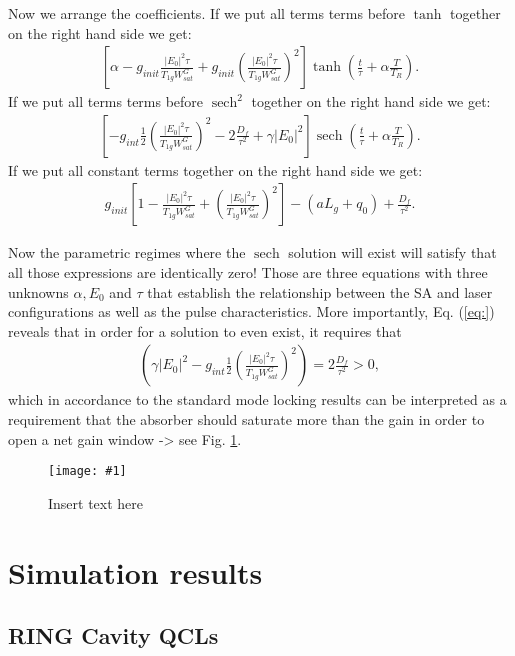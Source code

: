 \documentclass[preprint,secnumarabic,amssymb, nobibnotes, aip, prd]{revtex4-1}
\DeclareMathOperator{\sech}{sech}
\newcommand{\includegraphicsM}[1]{\texttt{[image: \#1]}}
\begin{document}
Now we arrange the coefficients. If we put all terms terms before $\tanh $ together on the right hand side we get:
\begin{align}
\label{eq:coefs1}
\left[\alpha -g_{init}\frac{|E_0|^2\tau}{T_{1g}W_{sat}^G} +g_{init}\left(\frac{|E_0|^2\tau}{T_{1g}W_{sat}^G}\right)^2 \right]\tanh(\frac{t}{\tau}+\alpha \frac{T}{T_R}).
\end{align}
If we put all terms terms before $\sech^2 $ together on the right hand side we get:
\begin{align}
\label{eq:coefs2}
\left[ -g_{int}\frac{1}{2}\left(\frac{|E_0|^2\tau}{T_{1g}W_{sat}^G}\right)^2 - 2\frac{D_f}{\tau^2} +\gamma|E_0|^2\right]\sech(\frac{t}{\tau}+\alpha \frac{T}{T_R}).
\end{align}
If we put all constant terms together on the right hand side we get:
\begin{align}
\label{eq:coefs3}
g_{init}\left[1-\frac{|E_0|^2\tau}{T_{1g}W_{sat}^G}+\left(\frac{|E_0|^2\tau}{T_{1g}W_{sat}^G}\right)^2 \right] -(aL_g+q_0) + \frac{D_f}{\tau^2}.
\end{align}

Now the parametric regimes where the $\sech$ solution will exist will satisfy that all those expressions are identically zero! Those are three equations with three unknowns $\alpha, E_0 $ and $\tau$ that establish the relationship between the SA and laser configurations as well as the pulse characteristics. More importantly, Eq. (\ref{eq:}) reveals that in order for a solution to even exist, it requires that 
\begin{align}
\left (\gamma|E_0|^2 -g_{int}\frac{1}{2}\left(\frac{|E_0|^2\tau}{T_{1g}W_{sat}^G}\right)^2\right)=2\frac{D_f}{\tau^2}>0, 
\end{align}
which in accordance to the standard mode locking results \cite{haus1975theoryslow} can be interpreted as a requirement that the absorber should saturate more than the gain in order to open a net gain window -> see Fig. \ref{fig:SCHEMA}. 
\begin{figure}[H]
	\centering
	\includegraphicsM{IMGS/SCHEMA}
	\caption{Insert text here}
	\label{fig:SCHEMA}
\end{figure}

\section{Simulation results}
\subsection{RING Cavity QCLs}
\end{document}
